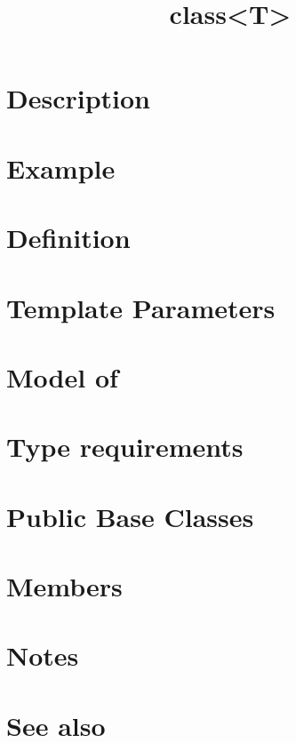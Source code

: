 \documentclass{article}
\begin{document}
\title{class<T>}
\maketitle

\section*{Description}
\section*{Example}
\section*{Definition}
\section*{Template Parameters}
\section*{Model of}
\section*{Type requirements}
\section*{Public Base Classes}
\section*{Members}
\section*{Notes}
\section*{See also}



\end{document}
